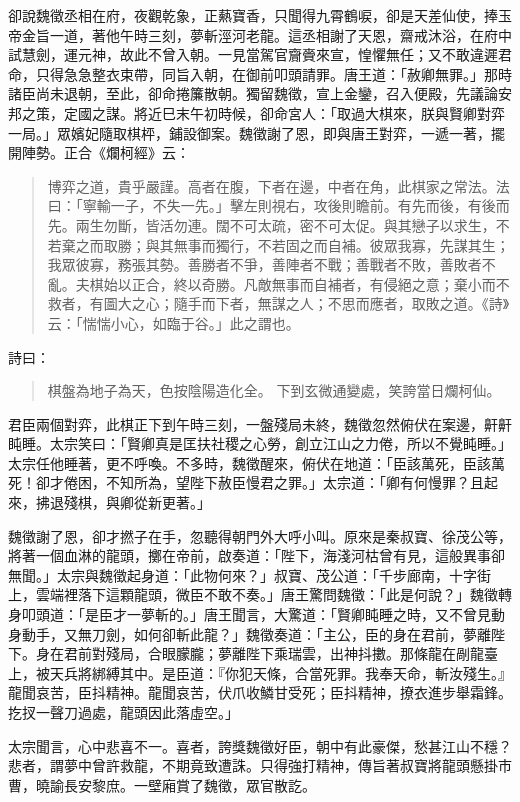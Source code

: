 卻說魏徵丞相在府，夜觀乾象，正爇寶香，只聞得九霄鶴唳，卻是天差仙使，捧玉帝金旨一道，著他午時三刻，夢斬涇河老龍。這丞相謝了天恩，齋戒沐浴，在府中試慧劍，運元神，故此不曾入朝。一見當駕官齎賫來宣，惶懼無任；又不敢違遲君命，只得急急整衣束帶，同旨入朝，在御前叩頭請罪。唐王道：「赦卿無罪。」那時諸臣尚未退朝，至此，卻命捲簾散朝。獨留魏徵，宣上金鑾，召入便殿，先議論安邦之策，定國之謀。將近巳末午初時候，卻命宮人：「取過大棋來，朕與賢卿對弈一局。」眾嬪妃隨取棋枰，鋪設御案。魏徵謝了恩，即與唐王對弈，一遞一著，擺開陣勢。正合《爛柯經》云：
\begin{quote}
博弈之道，貴乎嚴謹。高者在腹，下者在邊，中者在角，此棋家之常法。法曰：「寧輸一子，不失一先。」擊左則視右，攻後則瞻前。有先而後，有後而先。兩生勿斷，皆活勿連。闊不可太疏，密不可太促。與其戀子以求生，不若棄之而取勝；與其無事而獨行，不若固之而自補。彼眾我寡，先謀其生；我眾彼寡，務張其勢。善勝者不爭，善陣者不戰；善戰者不敗，善敗者不亂。夫棋始以正合，終以奇勝。凡敵無事而自補者，有侵絕之意；棄小而不救者，有圖大之心；隨手而下者，無謀之人；不思而應者，取敗之道。《詩》云：「惴惴小心，如臨于谷。」此之謂也。
\end{quote}

詩曰：
\begin{quote}
棋盤為地子為天，色按陰陽造化全。
下到玄微通變處，笑誇當日爛柯仙。
\end{quote}

君臣兩個對弈，此棋正下到午時三刻，一盤殘局未終，魏徵忽然俯伏在案邊，鼾鼾盹睡。太宗笑曰：「賢卿真是匡扶社稷之心勞，創立江山之力倦，所以不覺盹睡。」太宗任他睡著，更不呼喚。不多時，魏徵醒來，俯伏在地道：「臣該萬死，臣該萬死！卻才倦困，不知所為，望陛下赦臣慢君之罪。」太宗道：「卿有何慢罪？且起來，拂退殘棋，與卿從新更著。」

魏徵謝了恩，卻才撚子在手，忽聽得朝門外大呼小叫。原來是秦叔寶、徐茂公等，將著一個血淋的龍頭，擲在帝前，啟奏道：「陛下，海淺河枯曾有見，這般異事卻無聞。」太宗與魏徵起身道：「此物何來？」叔寶、茂公道：「千步廊南，十字街上，雲端裡落下這顆龍頭，微臣不敢不奏。」唐王驚問魏徵：「此是何說？」魏徵轉身叩頭道：「是臣才一夢斬的。」唐王聞言，大驚道：「賢卿盹睡之時，又不曾見動身動手，又無刀劍，如何卻斬此龍？」魏徵奏道：「主公，臣的身在君前，夢離陛下。身在君前對殘局，合眼朦朧；夢離陛下乘瑞雲，出神抖擻。那條龍在剮龍臺上，被天兵將綁縛其中。是臣道：『你犯天條，合當死罪。我奉天命，斬汝殘生。』龍聞哀苦，臣抖精神。龍聞哀苦，伏爪收鱗甘受死；臣抖精神，撩衣進步舉霜鋒。扢扠一聲刀過處，龍頭因此落虛空。」

太宗聞言，心中悲喜不一。喜者，誇獎魏徵好臣，朝中有此豪傑，愁甚江山不穩？悲者，謂夢中曾許救龍，不期竟致遭誅。只得強打精神，傳旨著叔寶將龍頭懸掛市曹，曉諭長安黎庶。一壁廂賞了魏徵，眾官散訖。

